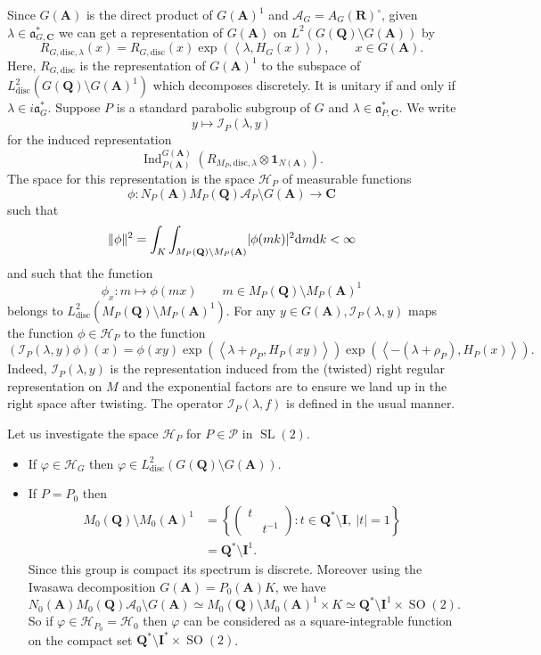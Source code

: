 \documentclass[11pt]{amsart}
\def\A{\mathbf A}
\def\C{\mathbf C}
\def\I{\mathbf I}
\def\Q{\mathbf Q}
\def\R{\mathbf R}
\def\AAA{\mathcal A}	%
\def\HHH{\mathcal H}
\def\III{\mathcal I}
\def\PPP{\mathcal P}
\def\aaa{\mathfrak a}
\def\cb#1{{\color{black}#1}}
\def\d{\text d}
\def\bs{\setminus} 			%
\def\disc{\text{disc}}
\def\Ind{\operatorname{Ind}}
\def\Ltwo{L^2}
\def\mod#1{\lvert #1 \rvert} %
\def\norm#1{\Vert #1 \Vert} %
\def\sl{\operatorname{SL}}
\def\sprod#1#2{\left\langle #1 , #2 \right\rangle}  %
\theoremstyle{remark}
\begin{document}
Since $G(\A)$ is the direct product of $G(\A)^1$ and $\AAA_G = A_G(\R)^\circ$, given $\lambda \in \aaa_{G, \C}^*$ we can get a representation of $G(\A)$ on $\Ltwo(G(\Q) \bs G(\A))$ by
\[ R_{G, \disc, \lambda}(x) = R_{G, \disc}(x) \exp(\sprod{\lambda}{H_G(x)}), \qquad x \in G(\A). \]
Here, $R_{G, \disc}$ is the representation of $G(\A)^1$ to the subspace of $\Ltwo_\disc(G(\Q)\bs G(\A)^1)$ which decomposes discretely. It is unitary if and only if $\lambda \in i\aaa_G^*$. Suppose $P$ is a standard parabolic subgroup of $G$ and $\lambda \in \aaa_{P, \C}^*$. We write 
\[ y \mapsto \III_P(\lambda, y) \]
for the induced representation 
\[ \Ind_{P(\A)}^{G(\A)}(R_{M_P, \disc, \lambda} \otimes \mathbf 1_{N(\A)}). \]
The space for this representation is the space $\HHH_P$ of measurable functions
\[ \phi : N_P(\A)M_P(\Q)\AAA_P \bs G(\A) \to \C \]
such that 
\[ \norm{\phi}^2 = \int_K \int_{M_P(\Q)\bs M_P(\A)} \mod{\phi(mk)}^2 \d m \d k < \infty \]
and such that the function
\[ \phi_x : m \mapsto \phi(mx) \qquad m \in M_P(\Q)\bs M_P(\A)^1 \]
belongs to $\Ltwo_\disc(M_P(\Q) \bs M_P(\A)^1)$.
For any $y \in G(\A), \III_P(\lambda, y)$ maps the function $\phi \in \HHH_P$ to the function
\[ (\III_P(\lambda, y)\phi)(x) = \phi(xy) \exp(\sprod{\lambda + \rho_P}{H_P(xy)}) 
		\exp(\sprod{-(\lambda + \rho_P)}{H_P(x)}). \]
Indeed, $\III_P(\lambda, y)$ is the representation induced from the (twisted) right regular representation on $M$ and the exponential factors are to ensure we land up in the right space after twisting. The operator $\III_P(\lambda, f)$ is defined in the usual manner. \cb{Let us investigate the space $\HHH_P$ for $P \in \PPP$ in $\sl(2)$. 
\begin{itemize}
	\item If $\varphi \in \HHH_G$ then $\varphi \in \Ltwo_{\disc}(G(\Q)\bs G(\A))$. 
	\item If $P = P_0$ then
		\begin{align*}
			M_0(\Q)\bs M_0(\A)^1 & = \left\{ \begin{pmatrix} t & \\ & t^{-1}	\end{pmatrix} : t \in \Q^* \bs\I , \ \mod{t} = 1 \right\} \\
					& = \Q^* \bs \I^1.
 		\end{align*}
		Since this group is compact its spectrum is discrete. Moreover using the Iwasawa decomposition $G(\A) = P_0(\A) K$, we have
		\[ N_0(\A)M_0(\Q)\AAA_0\bs G(\A) \simeq M_0(\Q)\bs M_0(\A)^1 \times K \simeq \Q^*\bs \I^1 \times \operatorname{SO}(2). \]
		So if $\varphi \in \HHH_{P_0} = \HHH_0$ then $\varphi$ can be considered as a square-integrable function on the compact set $\Q^*\bs \I^* \times \operatorname{SO}(2)$. 
\end{itemize}
}
\end{document}
